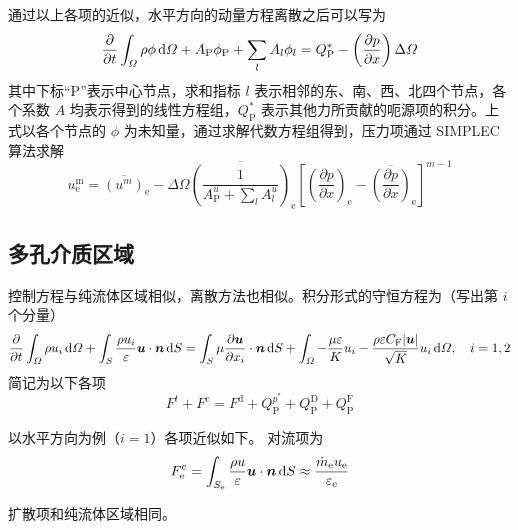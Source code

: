 通过以上各项的近似，水平方向的动量方程离散之后可以写为%
\begin{equation}
	\frac{\partial}{\partial t}\int_{\varOmega}\rho\phi\,\mathrm{d}\varOmega +
	A_{\mathrm{P}}\phi_{\mathrm{P}} + \sum_l A_l\phi_l = Q_{\mathrm{P}}^* - \left(\frac{\partial p}{\partial x}\right) \Delta\varOmega
\end{equation}
其中下标“P”表示中心节点，求和指标 $l$ 表示相邻的东、南、西、北四个节点，各个系数 $A$ 均表示得到的线性方程组，$Q_{\mathrm{P}}^*$ 表示其他力所贡献的呃源项的积分。上式以各个节点的 $\phi$ 为未知量，通过求解代数方程组得到，压力项通过 SIMPLEC 算法求解 \cite{Van1984}%
\begin{equation}\label{eq: Simplec}
	u_{\mathrm{e}}^{\mathrm{m}} = \overline{(u^m)}_{\mathrm{e}} - \Delta\varOmega \overline{\left(\frac{1}{A_{\mathrm{P}}^u+\sum_lA_l^u}\right)}_{\mathrm{e}} \left[\left(\frac{\partial p}{\partial x}\right)_{\mathrm{e}}-\overline{\left(\frac{\partial p}{\partial x}\right)}_{\mathrm{e}}\right]^{m-1}
\end{equation}

\subsection{多孔介质区域}

控制方程与纯流体区域相似，离散方法也相似。积分形式的守恒方程为（写出第 $i$ 个分量）
\begin{equation}\label{eq: porous conservation}
	\frac{\partial}{\partial t}\int_{\varOmega}\rho u_i\,\mathrm{d}\varOmega +
	\int_S\frac{\rho u_i}{\varepsilon}\bm{u}\cdot\bm{n}\,\mathrm{d} S =
	\int_S\mu\frac{\partial\bm{u}}{\partial x_i}\cdot\bm{n}\,\mathrm{d} S +
	\int_{\varOmega} - \frac{\mu\varepsilon}{K}u_i - 
	\frac{\rho\varepsilon C_{\mathrm{F}}\lvert\bm{u}\vert}{\sqrt K}u_i \,\mathrm{d}\varOmega, \quad i=1,2
\end{equation}
简记为以下各项
\begin{equation}
	F^t + F^{\mathrm{c}} = F^{\mathrm{d}} + Q_{\mathrm{P}}^{p^*} + Q_{\mathrm{P}}^{\mathrm{D}} + Q_{\mathrm{P}}^{\mathrm{F}}
\end{equation}

以水平方向为例（$i=1$）各项近似如下。
对流项为
\begin{equation}
	F_{\mathrm{e}}^{\mathrm{c}} = 
	\int_{S_{\mathrm{e}}}\frac{\rho u}{\varepsilon}\bm{u}\cdot\bm{n}\,\mathrm{d} S \approx \frac{\dot m_{\mathrm{e}} u_{\mathrm{e}}}{\varepsilon_{\mathrm{e}}}
\end{equation}

扩散项和纯流体区域相同。

